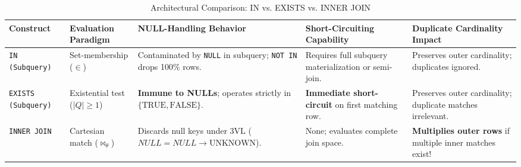 \documentclass[10pt,twocolumn,letterpaper]{article}
\begin{document}
\begin{table}[htbp]
\caption{Architectural Comparison: IN vs. EXISTS vs. INNER JOIN}
\label{tab:exists_vs_in}
\centering
\scriptsize
\begin{tabular}{p{2.2cm}p{2.6cm}p{3.1cm}p{3.1cm}p{3.2cm}}
\toprule
\textbf{Construct} & \textbf{Evaluation Paradigm} & \textbf{NULL-Handling Behavior} & \textbf{Short-Circuiting Capability} & \textbf{Duplicate Cardinality Impact} \\
\midrule
\texttt{IN (Subquery)} & Set-membership ($\in$) & Contaminated by \texttt{NULL} in subquery; \texttt{NOT IN} drops 100\% rows. & Requires full subquery materialization or semi-join. & Preserves outer cardinality; duplicates ignored. \\
\texttt{EXISTS (Subquery)} & Existential test ($|Q| \ge 1$) & \textbf{Immune to NULLs}; operates strictly in $\{\text{TRUE}, \text{FALSE}\}$. & \textbf{Immediate short-circuit} on first matching row. & Preserves outer cardinality; duplicate matches irrelevant. \\
\texttt{INNER JOIN} & Cartesian match ($\bowtie_\theta$) & Discards null keys under $3\text{VL}$ ($NULL = NULL \to \text{UNKNOWN}$). & None; evaluates complete join space. & \textbf{Multiplies outer rows} if multiple inner matches exist! \\
\bottomrule
\end{tabular}
\end{table}
\end{document}
